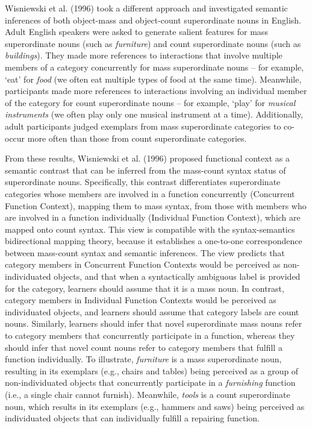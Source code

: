 \documentclass[
  man,floatsintext]{apa6}
\begin{document}
Wisniewski et al. (1996) took a different approach and investigated semantic inferences of both object-mass and object-count superordinate nouns in English. Adult English speakers were asked to generate salient features for mass superordinate nouns (such as \emph{furniture}) and count superordinate nouns (such as \emph{buildings}). They made more references to interactions that involve multiple members of a category concurrently for mass superordinate nouns -- for example, `eat' for \emph{food} (we often eat multiple types of food at the same time). Meanwhile, participants made more references to interactions involving an individual member of the category for count superordinate nouns -- for example, `play' for \emph{musical instruments} (we often play only one musical instrument at a time). Additionally, adult participants judged exemplars from mass superordinate categories to co-occur more often than those from count superordinate categories.

From these results, Wisniewski et al. (1996) proposed functional context as a semantic contrast that can be inferred from the mass-count syntax status of superordinate nouns. Specifically, this contrast differentiates superordinate categories whose members are involved in a function concurrently (Concurrent Function Context), mapping them to mass syntax, from those with members who are involved in a function individually (Individual Function Context), which are mapped onto count syntax. This view is compatible with the syntax-semantics bidirectional mapping theory, because it establishes a one-to-one correspondence between mass-count syntax and semantic inferences. The view predicts that category members in Concurrent Function Contexts would be perceived as non-individuated objects, and that when a syntactically ambiguous label is provided for the category, learners should assume that it is a mass noun. In contrast, category members in Individual Function Contexts would be perceived as individuated objects, and learners should assume that category labels are count nouns. Similarly, learners should infer that novel superordinate mass nouns refer to category members that concurrently participate in a function, whereas they should infer that novel count nouns refer to category members that fulfill a function individually. To illustrate, \emph{furniture} is a mass superordinate noun, resulting in its exemplars (e.g., chairs and tables) being perceived as a group of non-individuated objects that concurrently participate in a \emph{furnishing} function (i.e., a single chair cannot furnish). Meanwhile, \emph{tools} is a count superordinate noun, which results in its exemplars (e.g., hammers and saws) being perceived as individuated objects that can individually fulfill a repairing function.
\end{document}
